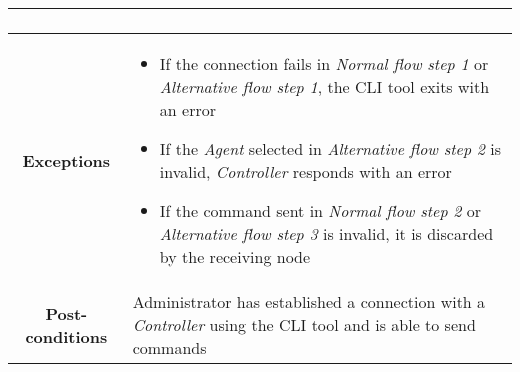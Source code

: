 \begin{longtable}{ |c|p{11.8cm}| }
{\begin{enumerate}
                    \end{enumerate}
                }\\ \hline
                \cellcolor[gray]{0.9} \textbf{Exceptions} & 
                    \begin{itemize}
                        \item If the connection fails in \textit{Normal flow step 1} or \textit{Alternative flow step 1}, the CLI tool exits with an error
                        \item If the \textit{Agent} selected in \textit{Alternative flow step 2} is invalid, \textit{Controller} responds with an error
                        \item If the command sent in \textit{Normal flow step 2} or \textit{Alternative flow step 3} is invalid, it is discarded by the receiving node
                    \end{itemize}\\ \hline
                \cellcolor[gray]{0.9} \textbf{Post-conditions} & Administrator has established a connection with a \textit{Controller} using the CLI tool and is able to send commands\\ \hline
            \end{longtable}

